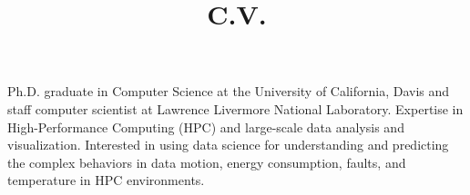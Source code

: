 \documentclass[11pt,a4paper,sans]{moderncv}        %
\title{C.V.}
\begin{document}
\makecvtitle

\small{Ph.D. graduate in Computer Science at the University of California, Davis and staff computer scientist at Lawrence Livermore National Laboratory. Expertise in High-Performance Computing (HPC) and large-scale data analysis and visualization. Interested in using data science for understanding and predicting the complex behaviors in data motion, energy consumption, faults, and temperature in HPC environments.}






\end{document}
